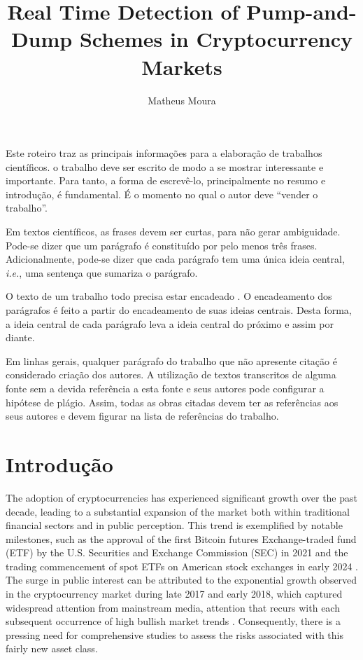 \documentclass[12pt]{article}
\title{Real Time Detection of Pump-and-Dump Schemes in Cryptocurrency Markets}
\author{Matheus Moura\inst{1}}
\begin{document}
 
	
	\maketitle
	
	\begin{resumo} 
		Este roteiro traz as principais informações para a elaboração de trabalhos científicos. o trabalho deve ser escrito de modo a se mostrar interessante e importante. Para tanto, a forma de escrevê-lo, principalmente no resumo e  introdução, é fundamental. É o momento no qual o autor deve ``vender o trabalho''. 
		
		Em textos científicos, as frases devem ser curtas, para não gerar ambiguidade. Pode-se dizer que um parágrafo é constituído por pelo menos três frases. Adicionalmente, pode-se dizer que cada parágrafo tem uma única ideia central, \emph{i.e.}, uma sentença  que sumariza o parágrafo. 
		
		O texto de um trabalho todo precisa estar encadeado \citep{zobel_writing_2015}. O encadeamento dos parágrafos é feito a partir do encadeamento de suas ideias centrais. Desta forma, a ideia central de cada parágrafo leva a ideia central do próximo e assim por diante. 
		
		Em linhas gerais, qualquer parágrafo do trabalho que não apresente citação é considerado criação dos autores. A utilização de textos transcritos de alguma fonte sem a devida referência a esta fonte e seus autores pode configurar a hipótese de plágio. Assim, todas as obras citadas devem ter as referências aos seus autores e devem figurar na lista de referências do trabalho.
	\end{resumo}
	
	\section{Introdução}
	\label{sec_introducao}

	The adoption of cryptocurrencies has experienced significant growth over the past decade, leading to a substantial expansion of the market both within traditional financial sectors and in public perception.
	This trend is exemplified by notable milestones, such as the approval of the first Bitcoin futures Exchange-traded fund (ETF) by the U.S. Securities and Exchange Commission (SEC) in 2021 \citep{wursthorn2021} and the trading commencement of spot ETFs on American stock exchanges in early 2024 \citep{schmitt2024}.
	The surge in public interest can be attributed to the exponential growth observed in the cryptocurrency market during late 2017 and early 2018, which captured widespread attention from mainstream media, attention that recurs with each subsequent occurrence of high bullish market trends \citep{steinmetz2021}.
	Consequently, there is a pressing need for comprehensive studies to assess the risks associated with this fairly new asset class.
\end{document}
